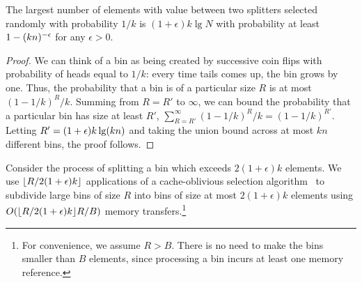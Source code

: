 \begin{lemma}
  The largest number of elements with value between two splitters selected randomly 
  with probability $1/k$ is $(1+\epsilon)k\lg N$ with probability at least 
  $1 - \mathopen{}\left(kn\right)\mathclose{}^{-\epsilon}$ for any $\epsilon > 0$.
  \label{lem:max_R}
\end{lemma}
\begin{proof}
  We can think of a bin as being created by successive coin flips with probability
  of heads equal to $1/k$: every time tails comes up, the bin grows by one.  Thus,
  the probability that a bin is of a particular size $R$ is at most $(1-1/k)^R / k$.
  Summing from $R=R'$ to $\infty$, we can bound the probability that a particular
  bin has size at least $R'$, $\sum_{R=R'}^{\infty}(1-1/k)^R/k = (1-1/k)^{R'}$.
  Letting $R'=(1+\epsilon)k\lg \mathopen{}\left(kn\right)\mathclose{}$ and taking the union bound across at most $kn$
  different bins, the proof follows.
\end{proof}

Consider the process of splitting a bin which exceeds $2(1+\epsilon)k$ elements.  We use 
$\mathopen{}\left\lfloor R/2(1+\epsilon)k \right\rfloor\mathclose{}$ applications of a cache-oblivious selection 
algorithm~\cite{FrigoLePr99} to subdivide large bins of size $R$ into bins of 
size at most $2(1+\epsilon)k$ elements using $O(\mathopen{}\left\lfloor R/2(1+\epsilon)k \right\rfloor\mathclose{} R/B)$ 
memory transfers.\footnote{For
convenience, we assume $R>B$.  There is no need to make the bins smaller than $B$
elements, since processing a bin incurs at least one memory reference.}

